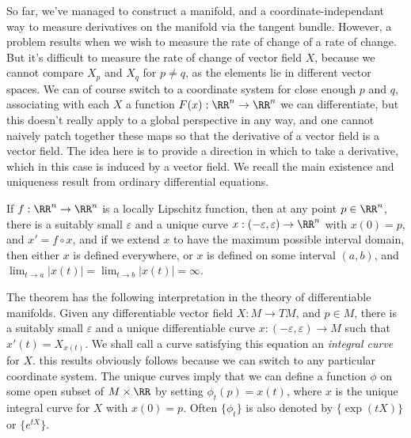So far, we've managed to construct a manifold, and a coordinate-independant way to measure derivatives on the manifold via the tangent bundle. However, a problem results when we wish to measure the rate of change of a rate of change. But it's difficult to measure the rate of change of vector field $X$, because we cannot compare $X_p$ and $X_q$ for $p \neq q$, as the elements lie in different vector spaces. We can of course switch to a coordinate system for close enough $p$ and $q$, associating with each $X$ a function $F(x) : \RR^n \to \RR^n$ we can differentiate, but this doesn't really apply to a global perspective in any way, and one cannot naively patch together these maps so that the derivative of a vector field is a vector field. The idea here is to provide a direction in which to take a derivative, which in this case is induced by a vector field. We recall the main existence and uniqueness result from ordinary differential equations.

\begin{theorem}
    If $f: \RR^n \to \RR^n$ is a locally Lipschitz function, then at any point $p \in \RR^n$, there is a suitably small $\varepsilon$ and a unique curve $x: (-\varepsilon, \varepsilon) \to \RR^n$ with $x(0) = p$, and $x' = f \circ x$, and if we extend $x$ to have the maximum possible interval domain, then either $x$ is defined everywhere, or $x$ is defined on some interval $(a,b)$, and $\lim_{t \to a} |x(t)| = \lim_{t \to b} |x(t)| = \infty$.
\end{theorem}

The theorem has the following interpretation in the theory of differentiable manifolds. Given any differentiable vector field $X: M \to TM$, and $p \in M$, there is a suitably small $\varepsilon$ and a unique differentiable curve $x: (-\varepsilon,\varepsilon) \to M$ such that $x'(t) = X_{x(t)}$. We shall call a curve satisfying this equation an \emph{integral curve} for $X$. this results obviously follows because we can switch to any particular coordinate system. The unique curves imply that we can define a function $\phi$ on some open subset of $M \times \RR$ by setting $\phi_t(p) = x(t)$, where $x$ is the unique integral curve for $X$ with $x(0) = p$. Often $\{ \phi_t \}$ is also denoted by $\{ \exp(tX) \}$ or $\{ e^{tX} \}$. 



